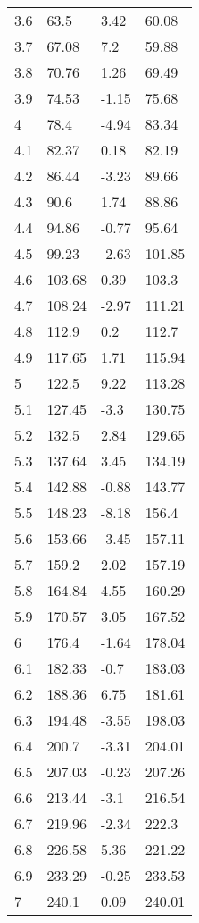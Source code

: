 \documentclass{article}
\begin{document}
\begin{center}
\begin{longtable}{|l|l|l|l|}
			3.6 & 63.5 & 3.42 & 60.08 \\ 
			3.7 & 67.08 & 7.2 & 59.88 \\ 
			3.8 & 70.76 & 1.26 & 69.49 \\ 
			3.9 & 74.53 & -1.15 & 75.68 \\ 
			4 & 78.4 & -4.94 & 83.34 \\ 
			4.1 & 82.37 & 0.18 & 82.19 \\ 
			4.2 & 86.44 & -3.23 & 89.66 \\ 
			4.3 & 90.6 & 1.74 & 88.86 \\ 
			4.4 & 94.86 & -0.77 & 95.64 \\ 
			4.5 & 99.23 & -2.63 & 101.85 \\ 
			4.6 & 103.68 & 0.39 & 103.3 \\ 
			4.7 & 108.24 & -2.97 & 111.21 \\ 
			4.8 & 112.9 & 0.2 & 112.7 \\ 
			4.9 & 117.65 & 1.71 & 115.94 \\ 
			5 & 122.5 & 9.22 & 113.28 \\ 
			5.1 & 127.45 & -3.3 & 130.75 \\ 
			5.2 & 132.5 & 2.84 & 129.65 \\ 
			5.3 & 137.64 & 3.45 & 134.19 \\ 
			5.4 & 142.88 & -0.88 & 143.77 \\ 
			5.5 & 148.23 & -8.18 & 156.4 \\ 
			5.6 & 153.66 & -3.45 & 157.11 \\ 
			5.7 & 159.2 & 2.02 & 157.19 \\ 
			5.8 & 164.84 & 4.55 & 160.29 \\ 
			5.9 & 170.57 & 3.05 & 167.52 \\ 
			6 & 176.4 & -1.64 & 178.04 \\ 
			6.1 & 182.33 & -0.7 & 183.03 \\ 
			6.2 & 188.36 & 6.75 & 181.61 \\ 
			6.3 & 194.48 & -3.55 & 198.03 \\ 
			6.4 & 200.7 & -3.31 & 204.01 \\ 
			6.5 & 207.03 & -0.23 & 207.26 \\ 
			6.6 & 213.44 & -3.1 & 216.54 \\ 
			6.7 & 219.96 & -2.34 & 222.3 \\ 
			6.8 & 226.58 & 5.36 & 221.22 \\ 
			6.9 & 233.29 & -0.25 & 233.53 \\ 
			7 & 240.1 & 0.09 & 240.01 \\ 

\end{longtable}
\end{center}
\end{document}
